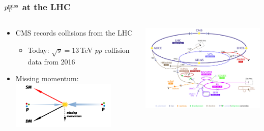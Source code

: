 \documentclass[aspectratio=169,xcolor=dvipsnames,,table,compress]{beamer}
\begin{document}
\begin{frame}[t]  \frametitle{$p_\text{T}^\text{miss}$ at the LHC}
  \vspace{-7mm}
  \begin{columns}[T]
  \begin{column}{0.4\textwidth}
    \begin{itemize}
      \item CMS records collisions from the LHC
      \begin{itemize}
        \item Today: $\sqrt{s}=13$\,TeV $pp$ collision data from 2016
      \end{itemize}
    \item Missing momentum:
        \includegraphics[width=0.8\textwidth]{../figures/talk/ptmiss3.pdf}
    \end{itemize}
  \end{column}
  \begin{column}{0.6\textwidth}
    \centering
    \includegraphics[width=\textwidth]{../figures/cms/lhc.png} \\

\end{column}
\end{columns}
\end{frame}
\end{document}
